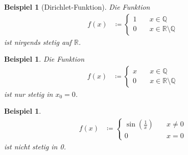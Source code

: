 \documentclass[11pt, twoside, a4paper]{article}
\theoremstyle{plain}
\newtheorem{beispiel}[blockelement]{Beispiel}
\newcommand{\pair}[1]{\left(#1\right)}
\newcommand{\definedas}[0]{\coloneqq}
\newcommand{\exclude}[0]{\setminus}
\newcommand{\R}{\mathbb{R}}
\newcommand{\Q}{\mathbb{Q}}
\begin{document}
    \begin{beispiel}[Dirichlet-Funktion]
        Die Funktion
        \begin{align*}
            f(x) &\definedas \begin{cases}
                                 1\quad &x\in\Q\\
                                 0\quad &x\in\R\exclude\Q
            \end{cases}
        \end{align*}
        ist nirgends stetig auf $\R$.
    \end{beispiel}
    \begin{beispiel}
        Die Funktion
        \begin{align*}
            f(x) &\definedas \begin{cases}
                                 x\quad &x\in\Q\\
                                 0\quad &x\in\R\exclude\Q
            \end{cases}
        \end{align*}
        ist nur stetig in $x_0=0$.
    \end{beispiel}
    \begin{beispiel}
        \begin{align*}
            f(x) &\definedas \begin{cases}
                                 \sin\pair{\frac{1}{x}}\quad &x\neq 0\\
                                 0\quad &x = 0
            \end{cases}
        \end{align*}
        ist nicht stetig in 0.
    \end{beispiel}

    \newpage
\end{document}
